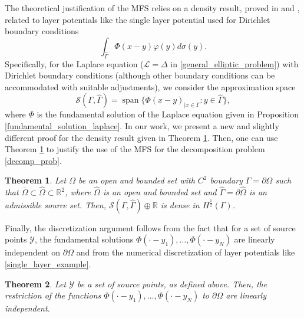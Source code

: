 \documentclass[5p,authoryear]{elsarticle}
\newtheorem{theorem}{Theorem}[subsection]
\DeclareMathOperator{\Span}{span}
\begin{document}
The theoretical justification of the MFS relies on a density result, proved in \cite{bogomolny1985fundamental} and \cite{alves2009choice}, related to layer potentials like the single layer potential used for Dirichlet boundary conditions
\begin{equation}\label{single_layer_example}
    \int_{\hat{\Gamma}}\Phi(x-y)\varphi(y)d\sigma(y).
\end{equation}
Specifically, for the Laplace equation (\(\mathcal{L} = \Delta\) in \eqref{general_elliptic_problem}) with Dirichlet boundary conditions (although other boundary conditions can be accommodated with suitable adjustments), we consider the approximation space
\[
    \mathcal{S}(\Gamma, \hat{\Gamma}) = \Span\{\Phi(x-y)_{|x \in \Gamma} : y \in \hat{\Gamma}\},
\]
where \(\Phi\) is the fundamental solution of the Laplace equation given in Proposition \ref{fundamental_solution_laplace}.
In our work, we present a new and slightly different proof for the density result given in Theorem \ref{MFS_lap_dense}. Then, one can use Theorem \ref{MFS_lap_dense} to justify the use of the MFS for the decomposition problem \eqref{decomp_prob}.
\begin{theorem}\label{MFS_lap_dense}
    Let \(\Omega\) be an open and bounded set with \(C^2\) boundary \(\Gamma = \partial \Omega\) such that \(\overline{\Omega} \subset \hat{\Omega} \subset \mathbb{R}^2\), where \(\hat{\Omega}\) is an open and bounded set and \(\hat{\Gamma} = \partial \hat{\Omega}\) is an admissible source set. Then, \(\mathcal{S}(\Gamma, \hat{\Gamma}) \oplus \mathbb{R}\) is dense in \(H^\frac{1}{2}(\Gamma)\).
\end{theorem}

Finally, the discretization argument follows from the fact that for a set of source points \(\mathcal{Y}\), the fundamental solutions \(\Phi(\cdot-y_1),\dots,\Phi(\cdot-y_N)\) are linearly independent on \(\partial \Omega\) and from the numerical discretization of layer potentials like \eqref{single_layer_example}.
\begin{theorem}\label{lapl_li}
    Let \(\mathcal{Y}\) be a set of source points, as defined above. Then, the restriction of the functions \(\Phi(\cdot-y_1),\dots,\Phi(\cdot-y_N)\) to \(\partial\Omega\) are linearly independent.
\end{theorem}
\end{document}
